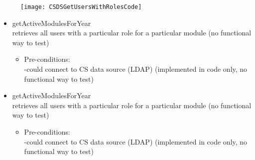 \begin {itemize}
\begin {itemize}
\begin{figure}[h!]
  \centering
    \texttt{[image: CSDSGetUsersWithRolesCode]} 
\end{figure}


\end {itemize}

\begin {itemize}
\item {getActiveModulesForYear}\\
retrieves all users with a particular role for a particular module (no functional way to test)
\begin {itemize}
\item Pre-conditions:\\
-could connect to CS data source (LDAP) (implemented in code only, no functional way to test)\\  
\end {itemize}
\end {itemize}

\begin {itemize}
\item {getActiveModulesForYear}\\
retrieves all users with a particular role for a particular module (no functional way to test)
\begin {itemize}
\item Pre-conditions:\\
-could connect to CS data source (LDAP) (implemented in code only, no functional way to test)\\  
\end {itemize}
\end {itemize}






\end {itemize}
